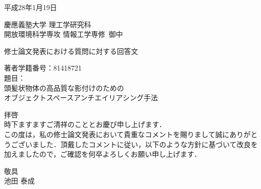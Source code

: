 \newcommand\submisson{平成28年1月19日}
\newcommand\affiliation{慶應義塾大学 理工学研究科\\
開放環境科学専攻 情報工学専修}
\newcommand\thesistitle{頭髪状物体の高品質な影付けのための\\オブジェクトスペースアンチエイリアシング手法}
\newcommand\studentid{81418721}
\newcommand\myname{池田 泰成}


{\large
\begin{flushright}
\submisson
\end{flushright}
\noindent
\affiliation\ 御中
}
\vspace{2cm}
{\LARGE
\begin{center}
修士論文発表における質問に対する回答文
\end{center}
}
\vspace{2cm}
{\Large
\noindent
著者学籍番号：\studentid
\\
題目：\\
\thesistitle
}

\vspace{1.5cm}
{\large 
\noindent
拝啓\\
時下ますますご清祥のこととお慶び申し上げます．\\
この度は，私の修士論文発表において貴重なコメントを賜りまして誠にありがとうございました．頂戴したコメントに従い，以下のような方針に基づいて改良を加えましたので，ご確認を何卒よろしくお願い申し上げます．
\begin{flushright}
敬具\\
\myname
\end{flushright}
}
\newpage

\newenvironment{qanda}
{\begin{enumerate}
\def\theenumi{\bf{\underline{質問\arabic{enumi}}}}
\def\labelenumi{\theenumi}
\let\escapeitem\item
\renewcommand\item{\setlength{\parskip}{0.5cm} \escapeitem}
}
{\end{enumerate}
\def\labelenumi{\arabic{enumi}.}
\let\item\escapeitem
}
\newcommand\q[1]{\textbf{\underline{#1}}\\}


